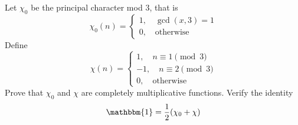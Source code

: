 \documentclass[11pt,letterpaper]{article}
\DeclareMathOperator{\1}{\mathbbm{1}}
\begin{document}
\begin{exercise}
  Let $\chi_0$ be the principal character mod $3$, that is
  \[\chi_0 (n) = \begin{cases}
      1 , \quad \gcd(x,3)=1 \\
      0, \quad \text{otherwise}
    \end{cases}\]
  Define
  \[\chi(n) = \begin{cases}
      1, \quad n \equiv 1 \pmod 3  \\
      -1, \quad n \equiv 2 \pmod 3 \\
      0, \quad \text{otherwise}
    \end{cases}\]
  Prove that $\chi_0$ and $\chi$ are completely multiplicative functions. Verify the identity
  \[ \mathbbm{1} = \dfrac{1}{2}(\chi_0 +\chi)\]
\end{exercise}
\end{document}
